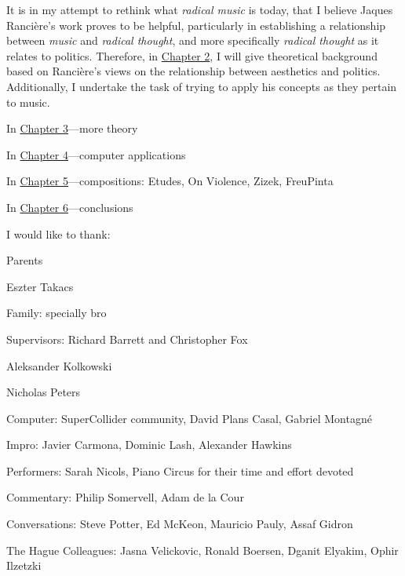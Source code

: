 It is in my attempt to rethink what \emph{radical music} is today, that I believe Jaques Ranci\`{e}re's work proves to be helpful, particularly in establishing a relationship between \emph{music} and \emph{radical thought}, and more specifically \emph{radical thought} as it relates to politics. Therefore, in \hyperlink{chapter2}{Chapter 2}, I will give theoretical background based on Ranci\`{e}re's views on the relationship between aesthetics and politics. Additionally, I undertake the task of trying to apply his concepts as they pertain to music. 

In \hyperlink{chapter3}{Chapter 3}---more theory

In \hyperlink{chapter4}{Chapter 4}---computer applications

In \hyperlink{chapter5}{Chapter 5}---compositions: Etudes, On Violence, Zizek, FreuPinta

In \hyperlink{chapter6}{Chapter 6}---conclusions


I would like to thank:

Parents 

Eszter Takacs

Family: specially bro

Supervisors: Richard Barrett and Christopher Fox

Aleksander Kolkowski

Nicholas Peters

Computer: SuperCollider community, David Plans Casal, Gabriel Montagn\'e

Impro: Javier Carmona, Dominic Lash, Alexander Hawkins

Performers: Sarah Nicols, Piano Circus for their time and effort devoted

Commentary: Philip Somervell, Adam de la Cour

Conversations: Steve Potter, Ed McKeon, Mauricio Pauly, Assaf Gidron

The Hague Colleagues: Jasna Velickovic, Ronald Boersen, Dganit Elyakim, Ophir Ilzetzki

\label{ch:preface}
